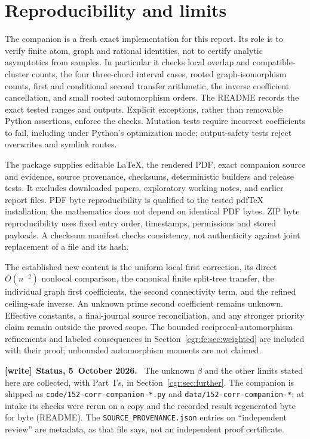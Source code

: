 \documentclass[11pt,letterpaper]{article}
\numberwithin{equation}{section}
\theoremstyle{definition}\newtheorem{definition}[theorem]{Definition}
\theoremstyle{remark}\newtheorem{remark}[theorem]{Remark}
\newcommand{\file}[1]{\nolinkurl{#1}}
\newenvironment{writenote}[1][]{\par\smallskip\begingroup\small
 \noindent\textbf{[write]}\if\relax\detokenize{#1}\relax\else~\textbf{#1.}\fi\ }%
 {\par\endgroup\smallskip}
\begin{document}
\section{Reproducibility and limits}\label{cgr:fc:sec:checks}
The companion is a fresh exact implementation for this report.
Its role is to verify finite atom, graph and rational identities,
not to certify analytic asymptotics from samples. In particular it
checks local overlap and compatible-cluster counts, the four
three-chord interval cases, rooted graph-isomorphism counts,
first and conditional second transfer arithmetic, the inverse
coefficient cancellation, and small rooted automorphism orders. The README records the exact tested
ranges and outputs. Explicit exceptions, rather than removable
Python assertions, enforce the checks. Mutation tests require
incorrect coefficients to fail, including under Python's
optimization mode; output-safety tests reject overwrites and
symlink routes.

The package supplies editable LaTeX, the rendered PDF, exact
companion source and evidence, source provenance, checksums,
deterministic builders and release tests. It excludes downloaded
papers, exploratory working notes, and earlier report files.
PDF byte reproducibility is qualified to the tested pdfTeX
installation; the mathematics does not depend on identical PDF
bytes. ZIP byte reproducibility uses fixed entry order, timestamps,
permissions and stored payloads. A checksum manifest checks
consistency, not authenticity against joint replacement of a file
and its hash.

The established new content is the uniform local first correction,
its direct $O(n^{-2})$ nonlocal comparison, the canonical finite
split-tree transfer, the individual graph first coefficients, the
second connectivity term, and the refined ceiling-safe inverse.
An unknown prime second coefficient remains unknown. Effective
constants, a final-journal source reconciliation, and any stronger
priority claim remain outside the proved scope. The bounded reciprocal-automorphism refinements and labeled
consequences in Section~\ref{cgr:fc:sec:weighted} are included with their
proof; unbounded automorphism moments are not claimed.
\begin{writenote}[Status, 5~October 2026]
The unknown $\beta$ and the other limits stated here are collected, with Part~I's, in Section~\ref{cgr:sec:further}. The companion is shipped as \file{code/152-corr-companion-*.py} and \file{data/152-corr-companion-*}; at intake its checks were rerun on a copy and the recorded result regenerated byte for byte (README). The \file{SOURCE_PROVENANCE.json} entries on ``independent review'' are metadata, as that file says, not an independent proof certificate.
\end{writenote}
\end{document}
